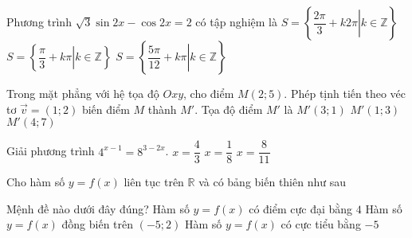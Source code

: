 \begin{ex}%
Phương trình $\sqrt{3}\sin 2x-\cos 2x=2$ có tập nghiệm là 
{$S=\left\{\left.\dfrac{2\pi}{3}+k2\pi\right| k\in\mathbb{Z}\right\}$}
{\True $S=\left\{\left.\dfrac{\pi}{3}+k\pi\right| k\in\mathbb{Z}\right\}$}
{$S=\left\{\left.\dfrac{5\pi}{12}+k\pi\right| k\in\mathbb{Z}\right\}$}
\end{ex}

\begin{ex}%
Trong mặt phẳng với hệ tọa độ $Oxy$, cho điểm $M(2;5)$. Phép tịnh tiến theo véc tơ $\overrightarrow{v}=(1;2)$ biến điểm $M$ thành $M'$. Tọa độ điểm $M'$ là
{$M'(3;1)$}
{$M'(1;3)$}
{$M'(4;7)$}
\end{ex}

\begin{ex}%
Giải phương trình $4^{x-1}=8^{3-2x}$.
{$x=\dfrac{4}{3}$}
{$x=\dfrac{1}{8}$}
{$x=\dfrac{8}{11}$}
\end{ex}

\begin{ex}%
Cho hàm số $y=f(x)$ liên tục trên $\mathbb{R}$ và có bảng biến thiên như sau
\begin{center}
\end{center}
Mệnh đề nào dưới đây đúng?
{Hàm số $y=f(x)$ có điểm cực đại bằng $4$}
{Hàm số $y=f(x)$ đồng biến trên $(-5;2)$}
{\True Hàm số $y=f(x)$ có cực tiểu bằng $-5$}
\end{ex}

